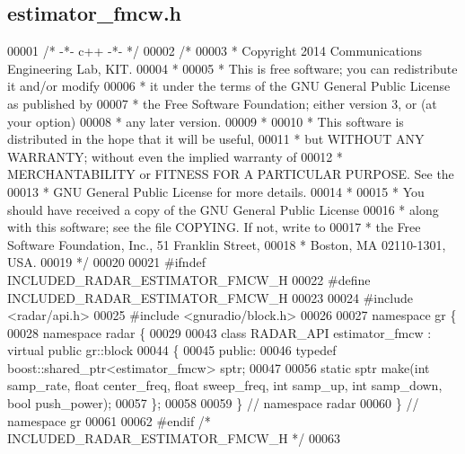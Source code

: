 \subsection{estimator\+\_\+fmcw.\+h}
\label{estimator__fmcw_8h_source}

\begin{DoxyCode}
00001 \textcolor{comment}{/* -*- c++ -*- */}
00002 \textcolor{comment}{/* }
00003 \textcolor{comment}{ * Copyright 2014 Communications Engineering Lab, KIT.}
00004 \textcolor{comment}{ * }
00005 \textcolor{comment}{ * This is free software; you can redistribute it and/or modify}
00006 \textcolor{comment}{ * it under the terms of the GNU General Public License as published by}
00007 \textcolor{comment}{ * the Free Software Foundation; either version 3, or (at your option)}
00008 \textcolor{comment}{ * any later version.}
00009 \textcolor{comment}{ * }
00010 \textcolor{comment}{ * This software is distributed in the hope that it will be useful,}
00011 \textcolor{comment}{ * but WITHOUT ANY WARRANTY; without even the implied warranty of}
00012 \textcolor{comment}{ * MERCHANTABILITY or FITNESS FOR A PARTICULAR PURPOSE.  See the}
00013 \textcolor{comment}{ * GNU General Public License for more details.}
00014 \textcolor{comment}{ * }
00015 \textcolor{comment}{ * You should have received a copy of the GNU General Public License}
00016 \textcolor{comment}{ * along with this software; see the file COPYING.  If not, write to}
00017 \textcolor{comment}{ * the Free Software Foundation, Inc., 51 Franklin Street,}
00018 \textcolor{comment}{ * Boston, MA 02110-1301, USA.}
00019 \textcolor{comment}{ */}
00020  
00021 \textcolor{preprocessor}{#ifndef INCLUDED\_RADAR\_ESTIMATOR\_FMCW\_H}
00022 \textcolor{preprocessor}{#define INCLUDED\_RADAR\_ESTIMATOR\_FMCW\_H}
00023 
00024 \textcolor{preprocessor}{#include <radar/api.h>}
00025 \textcolor{preprocessor}{#include <gnuradio/block.h>}
00026 
00027 \textcolor{keyword}{namespace }gr \{
00028   \textcolor{keyword}{namespace }radar \{
00029 
00043     \textcolor{keyword}{class }RADAR_API estimator_fmcw : \textcolor{keyword}{virtual} \textcolor{keyword}{public} gr::block
00044     \{
00045      \textcolor{keyword}{public}:
00046       \textcolor{keyword}{typedef} boost::shared\_ptr<estimator\_fmcw> sptr;
00047 
00056       \textcolor{keyword}{static} sptr make(\textcolor{keywordtype}{int} samp_rate, \textcolor{keywordtype}{float} center_freq, \textcolor{keywordtype}{float} sweep_freq, \textcolor{keywordtype}{int} 
      samp_up, \textcolor{keywordtype}{int} samp_down, \textcolor{keywordtype}{bool} push\_power);
00057     \};
00058 
00059   \} \textcolor{comment}{// namespace radar}
00060 \} \textcolor{comment}{// namespace gr}
00061 
00062 \textcolor{preprocessor}{#endif }\textcolor{comment}{/* INCLUDED\_RADAR\_ESTIMATOR\_FMCW\_H */}\textcolor{preprocessor}{}
00063 
\end{DoxyCode}
